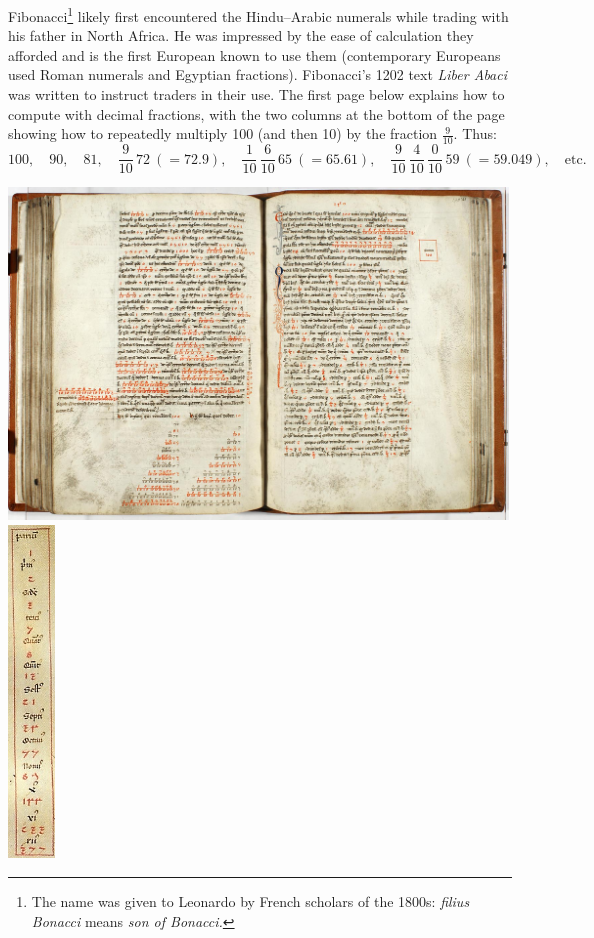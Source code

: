 Fibonacci\footnote{The name was given to Leonardo by French scholars of the 1800s: \emph{filius Bonacci} means \emph{son of Bonacci.}} likely first encountered the Hindu--Arabic numerals while trading with his father in North Africa. He was impressed by the ease of calculation they afforded and is the first European known to use them (contemporary Europeans used Roman numerals and Egyptian fractions). Fibonacci's 1202 text \emph{Liber Abaci} was written to instruct traders in their use. The first page below explains how to compute with decimal fractions, with the two columns at the bottom of the page showing how to repeatedly multiply 100 (and then 10) by the fraction $\frac 9{10}$. Thus:
\[
	100,\quad 90,\quad 81,\quad \frac 9{10}\, 72\ (=72.9),\quad \frac 1{10}\,\frac 6{10}\,65\ (=65.61),\quad\frac 9{10}\,\frac 4{10}\,\frac 0{10}\,59\ (=59.049),\quad\text{etc.}
\]
\begin{center}
	\includegraphics[height=250pt]{liberabaci3}
	\quad
	\includegraphics[height=250pt]{liberabaci1}
\end{center}

